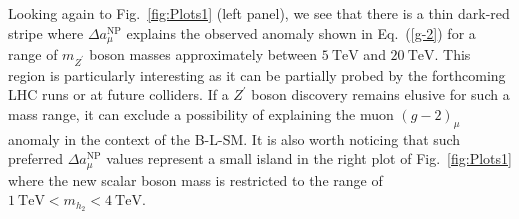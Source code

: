 \documentclass[a4paper,11pt]{article}
\renewcommand{\(}{\left(}
\renewcommand{\)}{\right)}
\renewcommand{\[}{\left[}
\renewcommand{\]}{\right]}
\newcommand{\ro}[1]{\textrm{#1}}
\begin{document}
Looking again to Fig.~\ref{fig:Plots1} (left panel), we see that there is a thin dark-red stripe where $\Delta a^\ro{NP}_\mu$ explains the observed anomaly shown in Eq.~(\ref{g-2}) for a range of $m_{Z^\prime}$ boson masses approximately between $5~\ro{TeV}$ and $20~\ro{TeV}$. This region is particularly interesting as it can be partially probed by the forthcoming LHC runs or at future colliders. If a $Z^\prime$ boson discovery remains elusive for such a mass range, it can exclude a possibility of explaining the muon $\left(g-2\right)_\mu$ anomaly in the context of the B-L-SM. It is also worth noticing that such preferred $\Delta a^\ro{NP}_\mu$ values represent a small island in the right plot of Fig.~\ref{fig:Plots1} where the new scalar boson mass is restricted to the range of $1~\ro{TeV} < m_{h_2} < 4~\ro{TeV}$.
\end{document}
